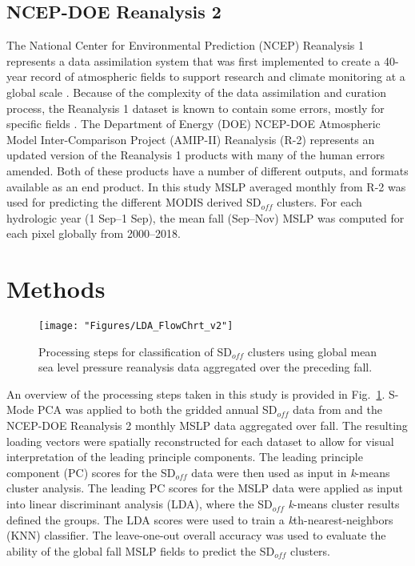 \documentclass{tATO2e}
\newcommand{\sdoff}{SD$_{off}$}
\begin{document}
\subsection{NCEP-DOE Reanalysis 2}
The National Center for Environmental Prediction (NCEP) Reanalysis 1 represents a data assimilation system that was first implemented to create a 40-year record of atmospheric fields to support research and climate monitoring at a global scale \citep{Kalnay1996}. Because of the complexity of the data assimilation and curation process, the Reanalysis 1 dataset is known to contain some errors, mostly for specific fields \citep{Kanamitsu2002}. The Department of Energy (DOE) NCEP-DOE Atmospheric Model Inter-Comparison Project (AMIP-II) Reanalysis (R-2) represents an updated version of the Reanalysis 1 products with many of the human errors amended. Both of these products have a number of different outputs, and formats available as an end product. In this study MSLP averaged monthly from R-2 was used for predicting the different MODIS derived \sdoff{} clusters. For each hydrologic year (1 Sep--1 Sep), the mean fall (Sep--Nov) MSLP was computed for each pixel globally from 2000--2018. 

\section{Methods}
\begin{figure}
\begin{center}
	\texttt{[image: "Figures/LDA\_FlowChrt\_v2"]}
	\caption{Processing steps for classification of \sdoff{} clusters using global mean sea level pressure reanalysis data aggregated over the preceding fall.}
	\label{flow-chart}
\end{center}
\end{figure}
An overview of the processing steps taken in this study is provided in Fig.~\ref{flow-chart}. S-Mode PCA was applied to both the gridded annual \sdoff{} data from \cite{Bevington2019} and the NCEP-DOE Reanalysis 2 monthly MSLP data aggregated over fall. The resulting loading vectors were spatially reconstructed for each dataset to allow for visual interpretation of the leading principle components. The leading principle component (PC) scores for the \sdoff{} data were then used as input in \textit{k}-means cluster analysis. The leading PC scores for the MSLP data were applied as input into linear discriminant analysis (LDA), where the \sdoff{} \textit{k}-means cluster results defined the groups. The LDA scores were used to train a \textit{k}th-nearest-neighbors (KNN) classifier. The leave-one-out overall accuracy was used to evaluate the ability of the global fall MSLP fields to predict the \sdoff{} clusters.
\end{document}

